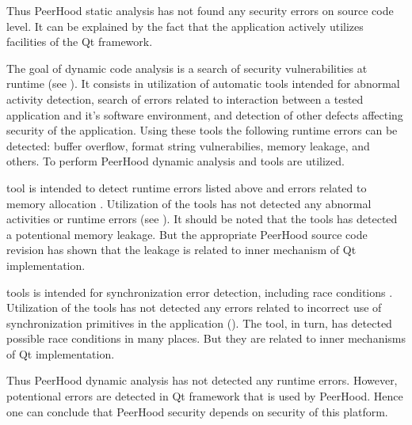 %
Thus PeerHood static analysis has not found any security errors on source code level. 
%
It can be explained by the fact that the application actively utilizes facilities of the Qt framework. 



%
The goal of dynamic code analysis is a search of security vulnerabilities at runtime (see ). 
%
It consists in utilization of automatic tools intended for abnormal activity detection, search of errors related to interaction between a tested application and it's software environment, and detection of other defects affecting security of the application. 
%
Using these tools the following runtime errors can be detected: buffer overflow, format string vulnerabilies, memory leakage, and others. 
%
To perform PeerHood dynamic analysis  and  tools are utilized. 

%
 tool is intended to detect runtime errors listed above and errors related to memory allocation . 
%
Utilization of the tools has not detected any abnormal activities or runtime errors (see ). 
%
It should be noted that the tools has detected a potentional memory leakage. 
%
But the appropriate PeerHood source code revision has shown that the leakage is related to inner mechanism of Qt implementation. 

%
 tools is intended for synchronization error detection, including race conditions . 
%
Utilization of the tools has not detected any errors related to incorrect use of synchronization primitives in the application (). 
%
The tool, in turn, has detected possible race conditions in many places. 
%
But they are related to inner mechanisms of Qt implementation. 

%
Thus PeerHood dynamic analysis has not detected any runtime errors. 
%
However, potentional errors are detected in Qt framework that is used by PeerHood. 
%
Hence one can conclude that PeerHood security depends on security of this platform. 

